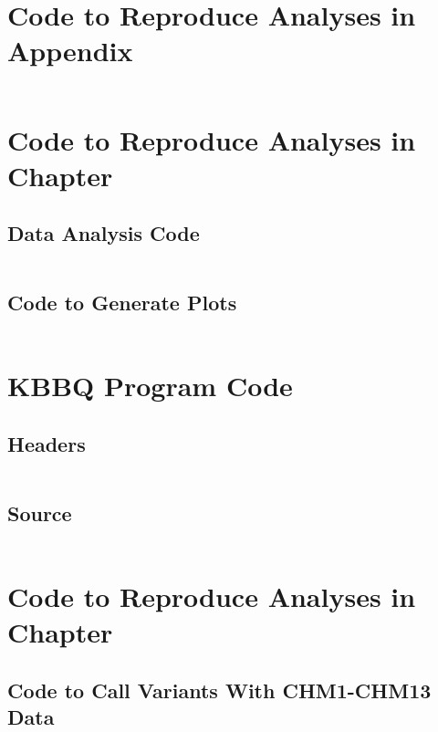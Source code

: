 
\chapter{Code to Reproduce Analyses in Appendix \protect\structuredref{}}
\label{ch:structured_code}
\newpage
\inputminted[breaklines, breakanywhere, tabsize=2]{Makefile}{ch3/scripts/ch3_makefiles.txt}

\chapter{Code to Reproduce Analyses in Chapter \protect\kbbqref{}}
\label{ch:kbbq_plot_code}
\newpage
\section{Data Analysis Code}
\inputminted[breaklines, breakanywhere, tabsize=2]{Makefile}{ch4/scripts/ch4_makefiles.txt}
\section{Code to Generate Plots}
\inputminted[breaklines, breakanywhere, tabsize=2]{r}{ch4/scripts/plot_benchmarks.R}

\chapter{KBBQ Program Code}
\label{ch:kbbq_code}
\newpage
\section{Headers}
\inputminted[breaklines, breakanywhere, tabsize=2]{cpp}{ch4/scripts/kbbq_include.hh}
\section{Source}
\inputminted[breaklines, breakanywhere, tabsize=2]{cpp}{ch4/scripts/kbbq_src.cc}

\chapter{Code to Reproduce Analyses in Chapter \protect\evaluatingref{}}
\label{ch:evaluating_code}
\newpage
\section{Code to Call Variants With CHM1-CHM13 Data}
\inputminted[breaklines, breakanywhere, tabsize=2]{Makefile}{ch5/scripts/chm1-chm13_variants_makefiles.txt}
